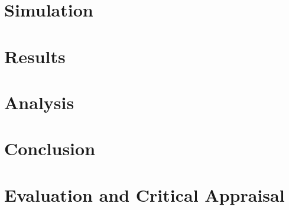 \documentclass{article}
\begin{document}
\section{Simulation}

\section{Results}

\section{Analysis}

\section{Conclusion}

\section{Evaluation and Critical Appraisal}



\end{document}
